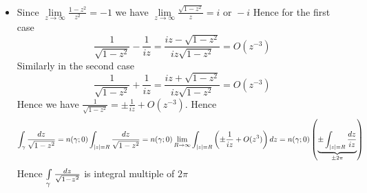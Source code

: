 \documentclass[a4paper, 11pt]{article}
\begin{document}
{\begin{itemize}
	Now suppose $\gm$ passes through $[-1,1]$. Now there exists another path $p$ which is not cut by $\gm$. Now we extend the branch to $\bbC-p$  and take circle of radius $r$  such that path $p$ lies in side the disk of radius $r$. This circle will form a homology basis  corresponding to $p$.
	\item Since $\lim\limits_{z\to \infty}\frac{1-z^2}{z^2}=-1$ we have $\lim\limits_{z\to \infty}\frac{\sqrt{1-z^2}}{z}=i\text{ or }-i$ Hence for the first case $$\frac{1}{\sqrt{1-z^2}}-\frac{1}{iz}=\frac{iz-\sqrt{1-z^2}}{iz\sqrt{1-z^2}}=O(z^{-3})$$Similarly in the second case $$\frac{1}{\sqrt{1-z^2}}+\frac{1}{iz}=\frac{iz+\sqrt{1-z^2}}{iz\sqrt{1-z^2}}=O(z^{-3})$$ Hence we have $\frac1{\sqrt{1-z^2}}=\pm\frac1{iz}+O(z^{-3})$. Hence $$\int_{\gamma}\frac{dz}{\sqrt{1-z^2}}=n(\gamma;0)\int_{|z|=R}\frac{dz}{\sqrt{1-z^2}}=n(\gamma;0)\lim_{R\to \infty}\int_{|z|=R}\left( \pm\frac1{iz}+O(z^3) \right)dz=n(\gamma;0)\left(\underbrace{\pm\int_{|z|=R}\frac{dz}{iz}}_{\pm 2\pi}\right)$$Hence $\int\limits_{\gamma}\frac{dz}{\sqrt{1-z^2}}$ is integral multiple of $2\pi$
	
	\end{itemize}
}
		

	
\end{document}
